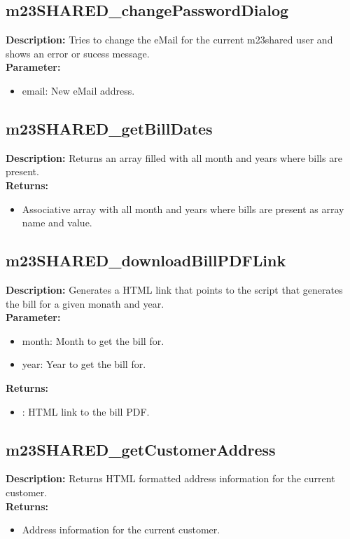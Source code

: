 \subsection{m23SHARED\_changePasswordDialog}
\textbf{Description:} Tries to change the eMail for the current m23shared user and shows an error or sucess message.\\
\textbf{Parameter:}
\begin{itemize}
\item email: New eMail address.
\end{itemize}

\subsection{m23SHARED\_getBillDates}
\textbf{Description:} Returns an array filled with all month and years where bills are present.\\
\textbf{Returns:}
\begin{itemize}
\item Associative array with all month and years where bills are present as array name and value.
\end{itemize}

\subsection{m23SHARED\_downloadBillPDFLink}
\textbf{Description:} Generates a HTML link that points to the script that generates the bill for a given monath and year.\\
\textbf{Parameter:}
\begin{itemize}
\item month: Month to get the bill for.
\item year: Year to get the bill for.
\end{itemize}
\textbf{Returns:}
\begin{itemize}
\item : HTML link to the bill PDF.
\end{itemize}

\subsection{m23SHARED\_getCustomerAddress}
\textbf{Description:} Returns HTML formatted address information for the current customer.\\
\textbf{Returns:}
\begin{itemize}
\item Address information for the current customer.
\end{itemize}

